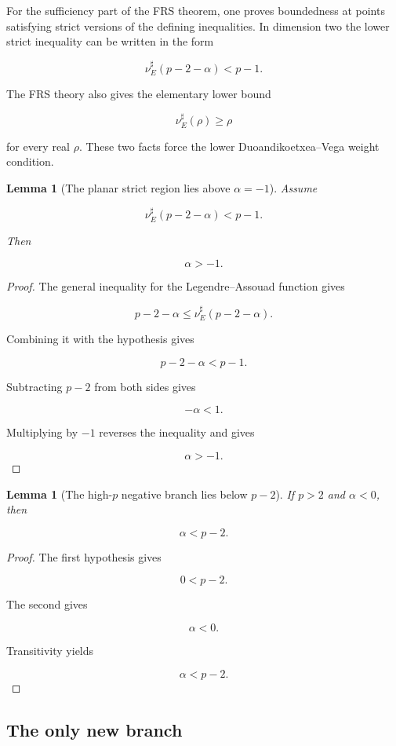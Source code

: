 \documentclass[11pt,a4paper]{article}
\newtheorem{lemma}[theorem]{Lemma}
\theoremstyle{definition}
\theoremstyle{remark}
\begin{document}
For the sufficiency part of the FRS theorem, one proves boundedness at points
satisfying strict versions of the defining inequalities.  In dimension two the
lower strict inequality can be written in the form

\[
\nu_E^\sharp(p-2-\alpha)<p-1.
\]

The FRS theory also gives the elementary lower bound

\[
\nu_E^\sharp(\rho)\geq\rho
\]

for every real $\rho$.  These two facts force the lower Duoandikoetxea--Vega
weight condition.

\begin{lemma}[The planar strict region lies above $\alpha=-1$]
Assume

\[
\nu_E^\sharp(p-2-\alpha)<p-1.
\]

Then

\[
\alpha>-1.
\]
\end{lemma}

\begin{proof}
The general inequality for the Legendre--Assouad function gives

\[
p-2-\alpha\leq\nu_E^\sharp(p-2-\alpha).
\]

Combining it with the hypothesis gives

\[
p-2-\alpha<p-1.
\]

Subtracting $p-2$ from both sides gives

\[
-\alpha<1.
\]

Multiplying by $-1$ reverses the inequality and gives

\[
\alpha>-1.
\]
\end{proof}

\begin{lemma}[The high-$p$ negative branch lies below $p-2$]
If $p>2$ and $\alpha<0$, then

\[
\alpha<p-2.
\]
\end{lemma}

\begin{proof}
The first hypothesis gives

\[
0<p-2.
\]

The second gives

\[
\alpha<0.
\]

Transitivity yields

\[
\alpha<p-2.
\]
\end{proof}

\subsection{The only new branch}
\end{document}

